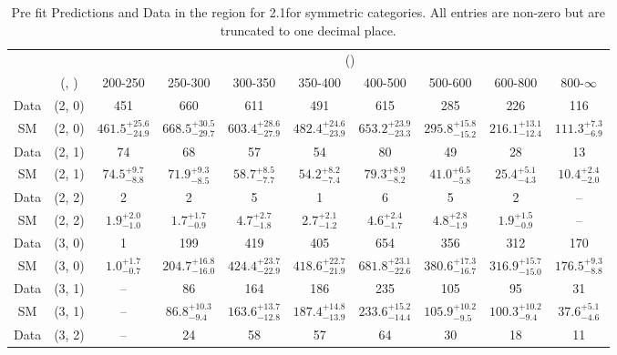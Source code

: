 \begin{table}[h!]
\tiny
\centering
\caption{Pre fit Predictions and Data in the \mj region for 2.1\ifb for symmetric categories. All entries are non-zero but are truncated to one decimal place.\label{tab:predallnaive_mu_comb_sym}}
\begin{tabular}
{cccccccccc}
	\hline\hline
	&	& \multicolumn{8}{c}{\scalht (\gev)}\\ 
	&	 (\njet, \nb) & 200-250 & 250-300 & 300-350 & 350-400 & 400-500 & 500-600 & 600-800 & 800-$\infty$ \\ [0.8ex] 
\hline
	Data & (2, 0) & 451 & 660 & 611 & 491 & 615 & 285 & 226 & 116 \\[0.5ex] 
	SM & (2, 0) & $461.5^{+ 25.6 }_{- 24.9 }$ & $668.5^{+ 30.5 }_{- 29.7 }$ & $603.4^{+ 28.6 }_{- 27.9 }$ & $482.4^{+ 24.6 }_{- 23.9 }$ & $653.2^{+ 23.9 }_{- 23.3 }$ & $295.8^{+ 15.8 }_{- 15.2 }$ & $216.1^{+ 13.1 }_{- 12.4 }$ & $111.3^{+ 7.3 }_{- 6.9 }$ \\[0.5ex] 
	Data & (2, 1) & 74 & 68 & 57 & 54 & 80 & 49 & 28 & 13 \\[0.5ex] 
	SM & (2, 1) & $74.5^{+ 9.7 }_{- 8.8 }$ & $71.9^{+ 9.3 }_{- 8.5 }$ & $58.7^{+ 8.5 }_{- 7.7 }$ & $54.2^{+ 8.2 }_{- 7.4 }$ & $79.3^{+ 8.9 }_{- 8.2 }$ & $41.0^{+ 6.5 }_{- 5.8 }$ & $25.4^{+ 5.1 }_{- 4.3 }$ & $10.4^{+ 2.4 }_{- 2.0 }$ \\[0.5ex] 
	Data & (2, 2) & 2 & 2 & 5 & 1 & 6 & 5 & 2 & -- \\[0.5ex] 
	SM & (2, 2) & $1.9^{+ 2.0 }_{- 1.0 }$ & $1.7^{+ 1.7 }_{- 0.9 }$ & $4.7^{+ 2.7 }_{- 1.8 }$ & $2.7^{+ 2.1 }_{- 1.2 }$ & $4.6^{+ 2.4 }_{- 1.7 }$ & $4.8^{+ 2.8 }_{- 1.9 }$ & $1.9^{+ 1.5 }_{- 0.9 }$ & -- \\[0.5ex] 
	Data & (3, 0) & 1 & 199 & 419 & 405 & 654 & 356 & 312 & 170 \\[0.5ex] 
	SM & (3, 0) & $1.0^{+ 1.7 }_{- 0.7 }$ & $204.7^{+ 16.8 }_{- 16.0 }$ & $424.4^{+ 23.7 }_{- 22.9 }$ & $418.6^{+ 22.7 }_{- 21.9 }$ & $681.8^{+ 23.1 }_{- 22.6 }$ & $380.6^{+ 17.3 }_{- 16.7 }$ & $316.9^{+ 15.7 }_{- 15.0 }$ & $176.5^{+ 9.3 }_{- 8.8 }$ \\[0.5ex] 
	Data & (3, 1) & -- & 86 & 164 & 186 & 235 & 105 & 95 & 31 \\[0.5ex] 
	SM & (3, 1) & -- & $86.8^{+ 10.3 }_{- 9.4 }$ & $163.6^{+ 13.7 }_{- 12.8 }$ & $187.4^{+ 14.8 }_{- 13.9 }$ & $233.6^{+ 15.2 }_{- 14.4 }$ & $105.9^{+ 10.2 }_{- 9.5 }$ & $100.3^{+ 10.2 }_{- 9.4 }$ & $37.6^{+ 5.1 }_{- 4.6 }$ \\[0.5ex] 
	Data & (3, 2) & -- & 24 & 58 & 57 & 64 & 30 & 18 & 11 \\[0.5ex] 

\end{tabular}
\end{table}
